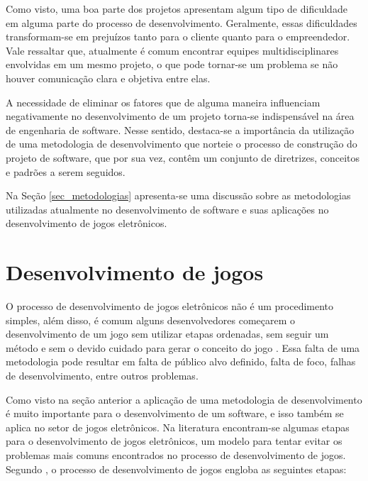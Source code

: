 \documentclass[quali]{ppgccufscar}
\begin{document}
Como visto, uma boa parte dos projetos apresentam algum tipo de dificuldade em alguma parte do processo de desenvolvimento. Geralmente, essas dificuldades transformam-se em prejuízos tanto para o cliente quanto para o empreendedor. Vale ressaltar que, atualmente é comum encontrar equipes multidisciplinares envolvidas em um mesmo projeto, o que pode tornar-se um problema se não houver comunicação clara e objetiva entre elas.

A necessidade de eliminar os  fatores que de alguma maneira influenciam negativamente no desenvolvimento de um projeto torna-se indispensável na área de engenharia de software. Nesse sentido, destaca-se a importância da utilização de uma metodologia de desenvolvimento que norteie o processo de construção do projeto de software, que por sua vez, contêm um conjunto de diretrizes, conceitos e padrões a serem seguidos.

Na Seção \ref{sec_metodologias} apresenta-se uma discussão sobre as metodologias utilizadas atualmente no desenvolvimento de software e suas aplicações no desenvolvimento de jogos eletrônicos.


\section{Desenvolvimento de jogos}
\label{sec_jogos}

O processo de desenvolvimento de jogos eletrônicos não é um procedimento simples, além disso, é comum alguns desenvolvedores começarem o desenvolvimento de um jogo sem utilizar etapas ordenadas, sem seguir um método e sem o devido cuidado para gerar o conceito do jogo \cite{schuytema2006,novak2012}. Essa falta de uma metodologia pode resultar em falta de público alvo definido, falta de foco, falhas de desenvolvimento, entre outros problemas.

Como visto na seção anterior a aplicação de uma metodologia de desenvolvimento é muito importante para o desenvolvimento de um software, e isso também se aplica no setor de jogos eletrônicos. Na literatura encontram-se algumas etapas para o desenvolvimento de jogos eletrônicos, um modelo para tentar evitar os problemas mais comuns encontrados no processo de desenvolvimento de jogos. Segundo , o processo de desenvolvimento de jogos engloba as seguintes etapas:
\end{document}
